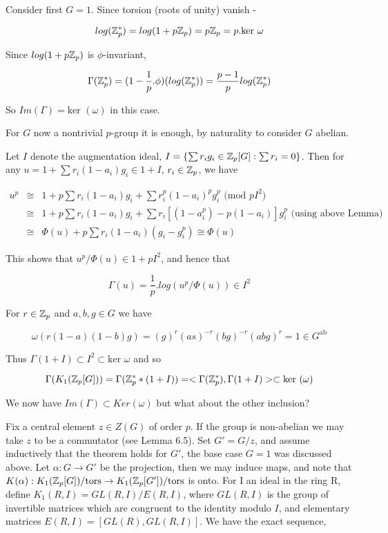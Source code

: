 Consider first $G=1$. Since torsion (roots of unity) vanish - 

$$log(\mathbb Z_p^*) = log(1+p\mathbb Z_p) = p\mathbb Z_p = p . \text{ker }\omega$$

Since $log(1+p\mathbb Z_p)$ is $\phi$-invariant, 

$$\Gamma (\mathbb Z_p^*) = (1-\frac{1}{p}.\phi) (log(\mathbb Z_p^*)) = \frac{p-1}{p} log (\mathbb Z_p^*)$$

So $Im(\Gamma) = \text{ker } (\omega)$ in this case.

For $G$ now a nontrivial $p$-group it is enough, by naturality to consider $G$ abelian.

Let $I$ denote the augmentation ideal, $I = \{ \sum r_i g_i \in \mathbb Z_p[G] : \sum r_i = 0\}$. Then for any $u = 1+ \sum r_i (1-a_i)g_i \in 1+I$, $r_i \in \mathbb Z_p$, we have

\begin{eqnarray}
\nonumber u^p &\cong& 1+p\sum r_i (1-a_i) g_i + \sum r_i^p (1-a_i)^pg_i^p \text{ (mod }pI^2)\\
\nonumber 	&\cong& 1+p\sum r_i (1-a_i) g_i +\sum r_i[(1-a_i^p)-p(1-a_i)]g_i^p \text{ (using above Lemma)}\\
\nonumber        &\cong& \Phi(u) + p\sum r_i(1-a_i)(g_i - g_i^p) \cong \Phi(u)
\end{eqnarray}

This shows that $u^p/\Phi(u)\in 1+pI^2$, and hence that 

$$\Gamma(u) = \frac{1}{p} . log (u^p / \Phi(u))\in I^2$$

For $r\in \mathbb Z_p$ and $a,b,g \in G$ we have

$$\omega(r(1-a)(1-b)g) = (g)^r (as)^{-r} (bg)^{-r} (abg)^r = 1\in G^{\text{ab}}$$

Thus $\Gamma(1+I) \subset I^2\subset \text{ker }\omega$ and so 

$$\Gamma(K_1(\mathbb Z_p [G])) = \Gamma(\mathbb Z_p^* * (1+I)) = <\Gamma(\mathbb Z_p^*), \Gamma(1+I)> \subset \text{ker }(\omega)$$

We now have $Im(\Gamma) \subset Ker (\omega)$ but what about the other inclusion?

Fix a central element $z\in Z(G)$ of order $p$. If the group is non-abelian we may take $z$ to be a commutator (see \cite{oliverwhitehead} Lemma 6.5). Set $G' = G/z$, and assume inductively that the theorem holds for $G'$, the base case $G=1$ was discussed above. Let $\alpha:G\rightarrow G'$ be the projection, then we may induce maps, and note that $K(\alpha): K_1(\mathbb Z_p[G])/ \text{tors} \rightarrow K_1(\mathbb Z_p[G'])/ \text{tors}$ is onto. For I an ideal in the ring R, define $K_1(R,I) = GL(R,I)/ E(R,I)$, where $GL(R,I)$ is the group of invertible matrices which are congruent to the identity modulo $I$, and elementary matrices $E(R,I) = [GL(R), GL(R,I)]$. We have the exact sequence,

